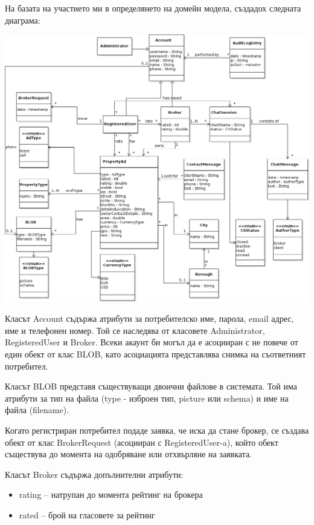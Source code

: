 \documentclass[a4paper]{article}
\begin{document}
На базата на участието ми в определянето на домейн модела, създадох следната диаграма:

\begin{center}
\includegraphics[scale=0.48,keepaspectratio=true]{domain-model}
\end{center}

Класът Account съдържа атрибути за потребителско име, парола, email адрес, име и телефонен номер. Той се наследява от класовете Administrator, RegisteredUser и Broker. Всеки акаунт би могъл да е асоцииран с не повече от един обект от клас BLOB, като асоциацията представлява снимка на съответният потребител.

Класът BLOB представя съществуващи двоични файлове в системата. Той има атрибути за тип на файла (type - изброен тип, picture или schema) и име на файла (filename).


Когато регистриран потребител подаде заявка, че иска да стане брокер, се създава обект от клас BrokerRequest (асоцииран с RegisteredUser-a), който обект съществува до момента на одобряване или отхвърляне на заявката.

Класът Broker съдържа допълнителни атрибути:
\begin{itemize}
\item rating -- натрупан до момента рейтинг на брокера
\item rated -- брой на гласовете за рейтинг
\end{itemize}
\end{document}
